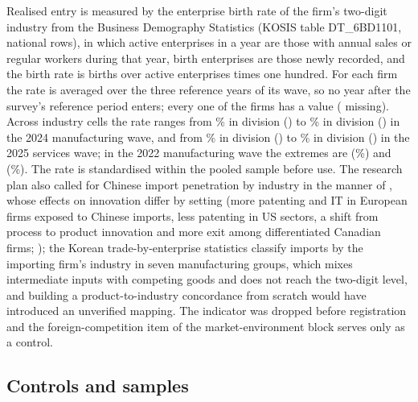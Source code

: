 \documentclass[preprint,12pt,authoryear]{elsarticle}
\begin{document}
Realised entry is measured by the enterprise birth rate of the firm's two-digit industry from the Business Demography Statistics (KOSIS table DT\_6BD1101, national rows), in which active enterprises in a year are those with annual sales or regular workers during that year, birth enterprises are those newly recorded, and the birth rate is births over active enterprises times one hundred. For each firm the rate is averaged over the three reference years of its wave, so no year after the survey's reference period enters; every one of the \NFirms{} firms has a value (\EntryRateMissingFirms{} missing). Across industry cells the rate ranges from \EntryRateMinTwoZeroTwoFourMPct\% in division \EntryMinIndTwoZeroTwoFourM{} (\EntryMinIndTwoZeroTwoFourMLabel) to \EntryRateMaxTwoZeroTwoFourMPct\% in division \EntryMaxIndTwoZeroTwoFourM{} (\EntryMaxIndTwoZeroTwoFourMLabel) in the 2024 manufacturing wave, and from \EntryRateMinTwoZeroTwoFiveSPct\% in division \EntryMinIndTwoZeroTwoFiveS{} (\EntryMinIndTwoZeroTwoFiveSLabel) to \EntryRateMaxTwoZeroTwoFiveSPct\% in division \EntryMaxIndTwoZeroTwoFiveS{} (\EntryMaxIndTwoZeroTwoFiveSLabel) in the 2025 services wave; in the 2022 manufacturing wave the extremes are \EntryMinIndTwoZeroTwoTwoMLabel{} (\EntryMinIndTwoZeroTwoTwoMPct\%) and \EntryMaxIndTwoZeroTwoTwoMLabel{} (\EntryMaxIndTwoZeroTwoTwoMPct\%). The rate is standardised within the pooled sample before use. The research plan also called for Chinese import penetration by industry in the manner of \citet{bloom2016trade}, whose effects on innovation differ by setting (more patenting and IT in European firms exposed to Chinese imports, less patenting in US sectors, a shift from process to product innovation and more exit among differentiated Canadian firms; \citealp{bloom2016trade,autor2020foreign,kueng2016emerging}); the Korean trade-by-enterprise statistics classify imports by the importing firm's industry in seven manufacturing groups, which mixes intermediate inputs with competing goods and does not reach the two-digit level, and building a product-to-industry concordance from scratch would have introduced an unverified mapping. The indicator was dropped before registration and the foreign-competition item of the market-environment block serves only as a control.

\subsection{Controls and samples}
\end{document}
